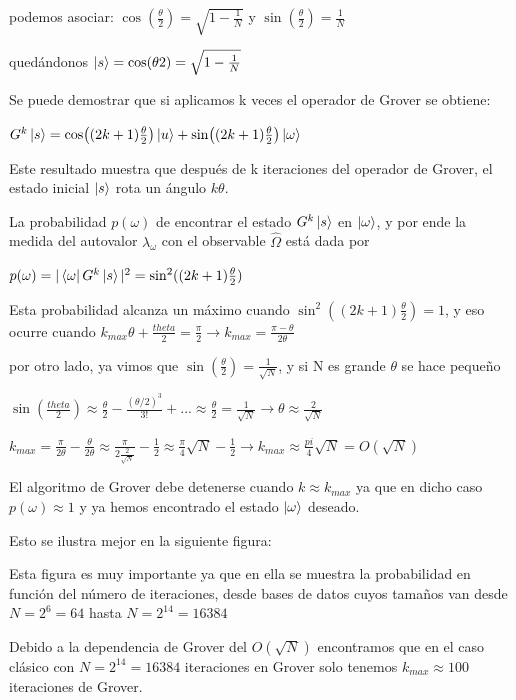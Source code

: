 podemos asociar: $\cos(\frac{\theta}{2}) = \sqrt{1-\frac{1}{N}}$ y
$\sin(\frac{\theta}{2}) = \frac{1}{N}$

quedándonos $\ket{s} = \cos({\theta}{2}) = \sqrt{1-\frac{1}{N}}$

Se puede demostrar que si aplicamos k veces el operador de Grover se obtiene:

$G^k \ket{s} = \cos((2k+1)\frac{\theta}{2}) \ket{u} +
\sin((2k+1)\frac{\theta}{2}) \ket{\omega}$

Este resultado muestra que después de k iteraciones del operador de Grover, el
estado inicial $\ket{s}$ rota un ángulo $k\theta$.


La probabilidad $p(\omega)$ de encontrar el estado $G^k \ket{s}$ en
$\ket{\omega}$, y por ende la medida del autovalor $\lambda_\omega$ con el
observable $\hat{\Omega}$ está dada por

$p(\omega) = |\bra{\omega} G^k \ket{s}|^2 = \sin^2((2k+1)\frac{\theta}{2})$

Esta probabilidad alcanza un máximo cuando $\sin^2((2k+1)\frac{\theta}{2}) = 1$,
y eso ocurre cuando $k_{max} \theta + \frac{theta}{2} = \frac{\pi}{2}
\rightarrow k_{max} = \frac{\pi-\theta}{2\theta}$

por otro lado, ya vimos que $\sin(\frac{\theta}{2}) = \frac{1}{\sqrt{N}}$, y si
N es grande $\theta$ se hace pequeño

$\sin(\frac{theta}{2}) \approx \frac{\theta}{2} - \frac{(\theta/2)^3}{3!} + ...
\approx \frac{\theta}{2} = \frac{1}{\sqrt{N}} \rightarrow \theta \approx \frac{2}{\sqrt{N}}$

$k_{max} = \frac{\pi}{2\theta} - \frac{\theta}{2\theta} \approx \frac{\pi}{2
  \frac{2}{\sqrt{N}}} - \frac{1}{2} \approx \frac{\pi}{4} \sqrt{N} - \frac{1}{2}
\rightarrow k_{max} \approx \frac{pi}{4} \sqrt{N} = O(\sqrt{N})$

El algoritmo de Grover debe detenerse cuando $k \approx k_{max}$ ya que en dicho
caso $p(\omega) \approx 1$ y ya hemos encontrado el estado $\ket{\omega}$
deseado.

Esto se ilustra mejor en la siguiente figura:


Esta figura es muy importante ya que en ella se muestra la probabilidad en
función del número de iteraciones, desde bases de datos cuyos tamaños van desde
$N = 2^6 = 64$ hasta $N = 2^{14} = 16384$

Debido a la dependencia de Grover del $O(\sqrt{N})$ encontramos que en el caso
clásico con $N = 2^{14} = 16384$ iteraciones en Grover solo tenemos $k_{max}
\approx 100$ iteraciones de Grover.

